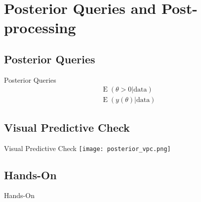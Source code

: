 
\section{Posterior Queries and Post-processing}
\subsection{Posterior Queries}
\begin{frame}{Posterior Queries}
    $$
    \begin{aligned}
        \operatorname{E}(\theta > 0 | \text{data}) \\
        \operatorname{E}(y(\theta) | \text{data})
    \end{aligned}
    $$
\end{frame}

\subsection{Visual Predictive Check}
\begin{frame}{Visual Predictive Check}
    \centering
    \texttt{[image: posterior\_vpc.png]}
\end{frame}

\subsection{Hands-On}
\begin{frame}{Hands-On}
\end{frame}
